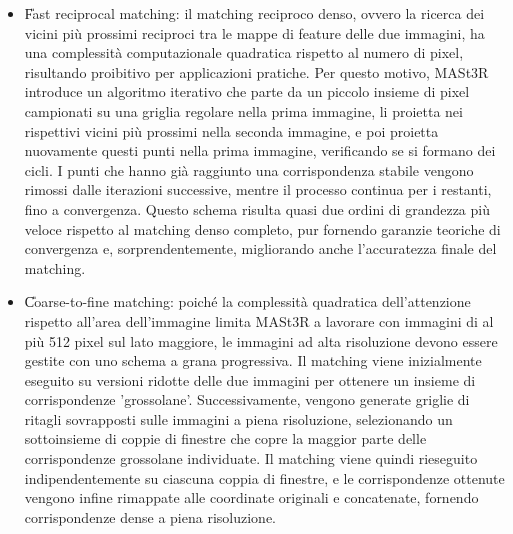\begin{itemize}
    \item \U{Fast reciprocal matching}: il matching reciproco denso, ovvero la ricerca dei vicini più prossimi reciproci tra le mappe di feature delle due immagini, ha una complessità computazionale quadratica rispetto al numero di pixel, risultando proibitivo per applicazioni pratiche. Per questo motivo, MASt3R introduce un algoritmo iterativo che parte da un piccolo insieme di pixel campionati su una griglia regolare nella prima immagine, li proietta nei rispettivi vicini più prossimi nella seconda immagine, e poi proietta nuovamente questi punti nella prima immagine, verificando se si formano dei cicli. I punti che hanno già raggiunto una corrispondenza stabile vengono rimossi dalle iterazioni successive, mentre il processo continua per i restanti, fino a convergenza. Questo schema risulta quasi due ordini di grandezza più veloce rispetto al matching denso completo, pur fornendo garanzie teoriche di convergenza e, sorprendentemente, migliorando anche l'accuratezza finale del matching.
    \item \U{Coarse-to-fine matching}: poiché la complessità quadratica dell'attenzione rispetto all'area dell'immagine limita MASt3R a lavorare con immagini di al più 512 pixel sul lato maggiore, le immagini ad alta risoluzione devono essere gestite con uno schema a grana progressiva. Il matching viene inizialmente eseguito su versioni ridotte delle due immagini per ottenere un insieme di corrispondenze 'grossolane'. Successivamente, vengono generate griglie di ritagli sovrapposti sulle immagini a piena risoluzione, selezionando un sottoinsieme di coppie di finestre che copre la maggior parte delle corrispondenze grossolane individuate. Il matching viene quindi rieseguito indipendentemente su ciascuna coppia di finestre, e le corrispondenze ottenute vengono infine rimappate alle coordinate originali e concatenate, fornendo corrispondenze dense a piena risoluzione. \cite{mast3r}
\end{itemize}



